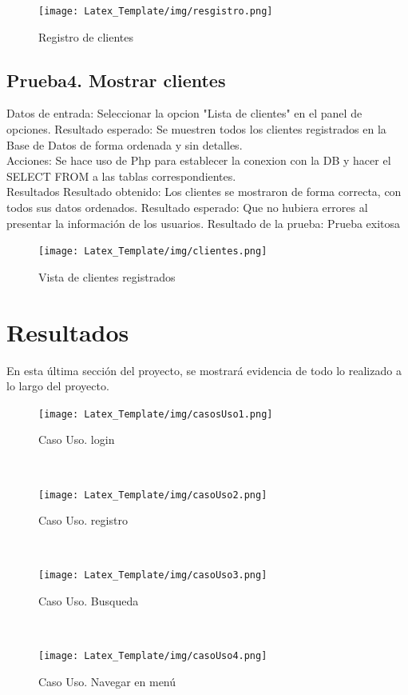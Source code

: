 \documentclass[a4paper,12pt]{article}
\begin{document}
\begin{figure}[ht]
  \centering
  \texttt{[image: Latex\_Template/img/resgistro.png]}
    \caption{Registro de clientes}
    \label{fig:image}
\end{figure}

\subsection{Prueba4. Mostrar clientes}
Datos de entrada: Seleccionar la opcion "Lista de clientes" en el panel de opciones. 
Resultado esperado: Se muestren todos los clientes registrados en la Base de Datos de forma ordenada y sin detalles.\\

Acciones: Se hace uso de Php para establecer la conexion con la DB y hacer el SELECT FROM a las tablas correspondientes. \\

Resultados
Resultado obtenido: Los clientes se mostraron de forma correcta, con todos sus datos ordenados. 
Resultado esperado: Que no hubiera errores al presentar la información de los usuarios. 
Resultado de la prueba: Prueba exitosa\\

\begin{figure}[ht]
  \centering
  \texttt{[image: Latex\_Template/img/clientes.png]}
    \caption{Vista de clientes registrados}
    \label{fig:image}
\end{figure}

\newpage
\newpage
\section{Resultados}
En esta última sección del proyecto, se mostrará evidencia de todo lo realizado a lo largo del proyecto. 
\begin{figure}[ht]
  \centering
  \texttt{[image: Latex\_Template/img/casosUso1.png]}
    \caption{Caso Uso. login}
    \label{fig:image}
\end{figure}\\

\begin{figure}[ht]
  \centering
  \texttt{[image: Latex\_Template/img/casoUso2.png]}
    \caption{Caso Uso. registro}
    \label{fig:image}
\end{figure}\\

\begin{figure}[ht]
  \centering
  \texttt{[image: Latex\_Template/img/casoUso3.png]}
    \caption{Caso Uso. Busqueda}
    \label{fig:image}
\end{figure}\\


\begin{figure}[ht]
  \centering
  \texttt{[image: Latex\_Template/img/casoUso4.png]}
    \caption{Caso Uso. Navegar en menú }
    \label{fig:image}
\end{figure}\\
\end{document}
